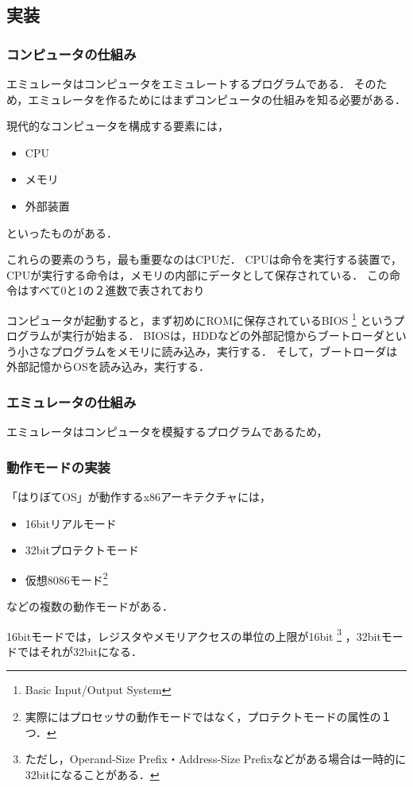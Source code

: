 \documentclass[10pt,a4j]{jsarticle}
\begin{document}
\subsection{実装}
\subsubsection{コンピュータの仕組み}
エミュレータはコンピュータをエミュレートするプログラムである．
そのため，エミュレータを作るためにはまずコンピュータの仕組みを知る必要がある．

現代的なコンピュータを構成する要素には，
\begin{itemize}
	\item CPU
	\item メモリ
	\item 外部装置
\end{itemize}
といったものがある．

これらの要素のうち，最も重要なのはCPUだ．
CPUは命令を実行する装置で，
CPUが実行する命令は，メモリの内部にデータとして保存されている．
この命令はすべて0と1の２進数で表されており

コンピュータが起動すると，まず初めにROMに保存されているBIOS
\footnote{Basic Input/Output System}
というプログラムが実行が始まる．
BIOSは，HDDなどの外部記憶からブートローダという小さなプログラムをメモリに読み込み，実行する．
そして，ブートローダは外部記憶からOSを読み込み，実行する．

\subsubsection{エミュレータの仕組み}
エミュレータはコンピュータを模擬するプログラムであるため，



\subsubsection{動作モードの実装}
「はりぼてOS」が動作するx86アーキテクチャには，
\begin{itemize}
	\item 16bitリアルモード
	\item 32bitプロテクトモード
	\item 仮想8086モード\footnote{実際にはプロセッサの動作モードではなく，プロテクトモードの属性の１つ．}
\end{itemize}
などの複数の動作モードがある．

16bitモードでは，レジスタやメモリアクセスの単位の上限が16bit
\footnote{ただし，Operand-Size Prefix・Address-Size Prefixなどがある場合は一時的に32bitになることがある．}
，32bitモードではそれが32bitになる．
\end{document}
